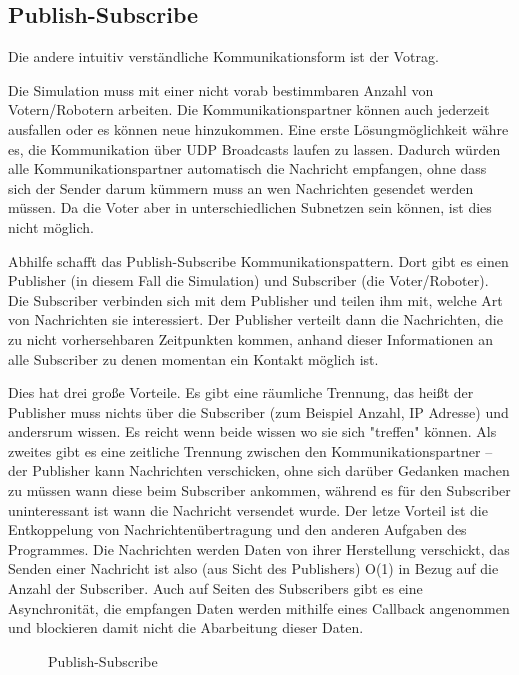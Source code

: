 \subsection{Publish-Subscribe}
Die andere intuitiv verst{\"{a}}ndliche Kommunikationsform ist der Votrag.

Die Simulation muss mit einer nicht vorab bestimmbaren Anzahl von Votern/Robotern arbeiten. Die Kommunikationspartner k{\"{o}}nnen auch jederzeit ausfallen oder es k{\"{o}}nnen neue hinzukommen.
Eine erste L{\"{o}}sungm{\"{o}}glichkeit w{\"{a}}hre es, die Kommunikation {\"{u}}ber UDP Broadcasts
laufen zu lassen. Dadurch w{\"{u}}rden alle Kommunikationspartner automatisch die Nachricht empfangen, ohne
dass sich der Sender darum k{\"{u}}mmern muss an wen Nachrichten gesendet werden m{\"{u}}ssen. Da die
Voter aber in unterschiedlichen Subnetzen sein k{\"{o}}nnen, ist dies nicht m{\"{o}}glich.

Abhilfe schafft das Publish-Subscribe Kommunikationspattern\cite{pubsub}. Dort gibt es einen Publisher (in
diesem Fall die Simulation) und Subscriber (die Voter/Roboter). Die Subscriber verbinden sich mit dem
Publisher und teilen ihm mit, welche Art von Nachrichten sie interessiert. Der Publisher verteilt dann die
Nachrichten, die zu nicht vorhersehbaren Zeitpunkten kommen, anhand dieser Informationen an alle Subscriber zu denen momentan ein Kontakt m{\"{o}}glich ist.

Dies hat drei gro{\ss}e Vorteile. Es gibt eine r{\"{a}}umliche Trennung, das hei{\ss}t der Publisher muss
nichts {\"{u}}ber die Subscriber (zum Beispiel Anzahl, IP Adresse) und andersrum wissen. Es reicht
wenn beide wissen wo sie sich "treffen" k{\"{o}}nnen. Als zweites gibt es eine zeitliche Trennung zwischen
den Kommunikationspartner -- der Publisher kann Nachrichten verschicken, ohne sich dar{\"{u}}ber Gedanken
machen zu m{\"{u}}ssen wann diese beim Subscriber ankommen, w{\"{a}}hrend es f{\"{u}}r den Subscriber
uninteressant ist wann die Nachricht versendet wurde. Der letze Vorteil ist die Entkoppelung von
Nachrichten{\"{u}}bertragung und den anderen Aufgaben des Programmes. Die Nachrichten werden Daten
von ihrer Herstellung verschickt, das Senden einer Nachricht ist also (aus Sicht des
Publishers) O(1) in Bezug auf die Anzahl der Subscriber. Auch auf Seiten des Subscribers gibt es eine
Asynchronit{\"{a}}t, die empfangen Daten werden mithilfe eines Callback angenommen und blockieren damit
nicht die Abarbeitung dieser Daten.

\begin{figure}
	\centering
	\caption{Publish-Subscribe}
	\label{fig:pubsub}
\end{figure}


